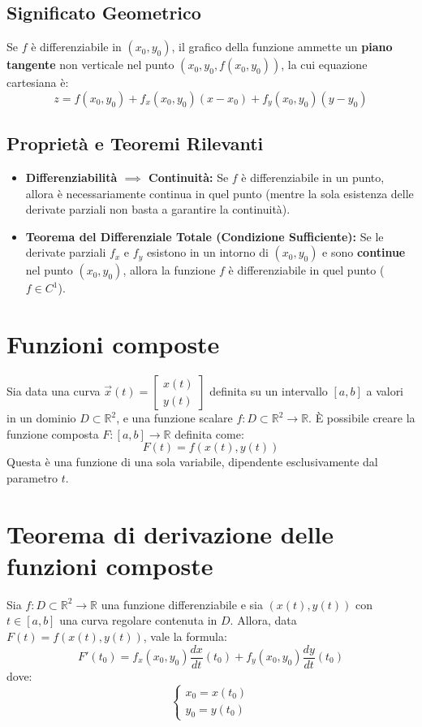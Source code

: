 \subsection{Significato Geometrico}
Se $f$ è differenziabile in $(x_0, y_0)$, il grafico della funzione ammette un \textbf{piano tangente} non verticale nel punto $(x_0, y_0, f(x_0, y_0))$, la cui equazione cartesiana è:
\begin{equation*}
    z = f(x_0, y_0) + f_x(x_0, y_0)(x - x_0) + f_y(x_0, y_0)(y - y_0)
\end{equation*}

\subsection{Proprietà e Teoremi Rilevanti}
\begin{itemize}
    \item \textbf{Differenziabilità $\implies$ Continuità:} Se $f$ è differenziabile in un punto, allora è necessariamente continua in quel punto (mentre la sola esistenza delle derivate parziali non basta a garantire la continuità).
    \item \textbf{Teorema del Differenziale Totale (Condizione Sufficiente):} Se le derivate parziali $f_x$ e $f_y$ esistono in un intorno di $(x_0, y_0)$ e sono \textbf{continue} nel punto $(x_0, y_0)$, allora la funzione $f$ è differenziabile in quel punto ($f \in C^1$).
\end{itemize}

\section{Funzioni composte}
Sia data una curva $\vec{x}(t) = \begin{bmatrix} x(t) \\ y(t) \end{bmatrix}$ definita su un intervallo $[a,b]$ a valori in un dominio $D \subset \mathbb{R}^2$, e una funzione scalare $f: D \subset \mathbb{R}^2 \to \mathbb{R}$.
È possibile creare la funzione composta $F: [a,b] \to \mathbb{R}$ definita come:
\[ F(t) = f(x(t), y(t)) \]
Questa è una funzione di una sola variabile, dipendente esclusivamente dal parametro $t$.

\section{Teorema di derivazione delle funzioni composte}
Sia $f: D \subset \mathbb{R}^2 \to \mathbb{R}$ una funzione differenziabile e sia $(x(t), y(t))$ con $t \in [a,b]$ una curva regolare contenuta in $D$.
Allora, data $F(t) = f(x(t), y(t))$, vale la formula:
\[ F'(t_0) = f_x(x_0, y_0) \frac{dx}{dt}(t_0) + f_y(x_0, y_0) \frac{dy}{dt}(t_0) \]
dove:
\[
\begin{cases}
x_0 = x(t_0) \\
y_0 = y(t_0)
\end{cases}
\]

